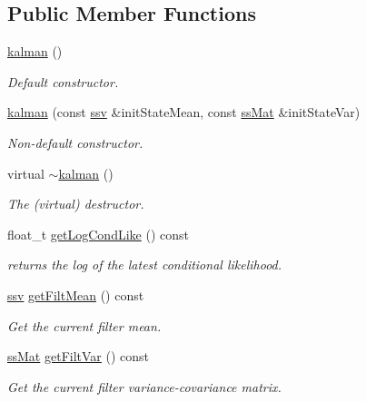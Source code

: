 \subsection*{Public Member Functions}
\begin{DoxyCompactItemize}
\item 
\hyperlink{classkalman_a8b05d79f154bf5669457a3e95f7323d5}{kalman} ()
\begin{DoxyCompactList}\small\item\em Default constructor. \end{DoxyCompactList}\item 
\hyperlink{classkalman_a91ec8bcb52e26df651001d8f8e574373}{kalman} (const \hyperlink{classkalman_a732cf05b5ddd106cfdafc324d03f756e}{ssv} \&init\+State\+Mean, const \hyperlink{classkalman_a581550d9aba33245fb496b22a834831c}{ss\+Mat} \&init\+State\+Var)
\begin{DoxyCompactList}\small\item\em Non-\/default constructor. \end{DoxyCompactList}\item 
\mbox{\label{classkalman_ae9284574db789ce2d961b6fe62d80fac}} 
virtual \hyperlink{classkalman_ae9284574db789ce2d961b6fe62d80fac}{$\sim$kalman} ()
\begin{DoxyCompactList}\small\item\em The (virtual) destructor. \end{DoxyCompactList}\item 
float\+\_\+t \hyperlink{classkalman_aaf359a2d65f4f0ae8eb26603205b6f9b}{get\+Log\+Cond\+Like} () const
\begin{DoxyCompactList}\small\item\em returns the log of the latest conditional likelihood. \end{DoxyCompactList}\item 
\hyperlink{classkalman_a732cf05b5ddd106cfdafc324d03f756e}{ssv} \hyperlink{classkalman_a247a3cef3a1fcec8c858372014276acf}{get\+Filt\+Mean} () const
\begin{DoxyCompactList}\small\item\em Get the current filter mean. \end{DoxyCompactList}\item 
\hyperlink{classkalman_a581550d9aba33245fb496b22a834831c}{ss\+Mat} \hyperlink{classkalman_af88f227e98383b222dc765b11df626c1}{get\+Filt\+Var} () const
\begin{DoxyCompactList}\small\item\em Get the current filter variance-\/covariance matrix. \end{DoxyCompactList}\item 

\end{DoxyCompactItemize}
